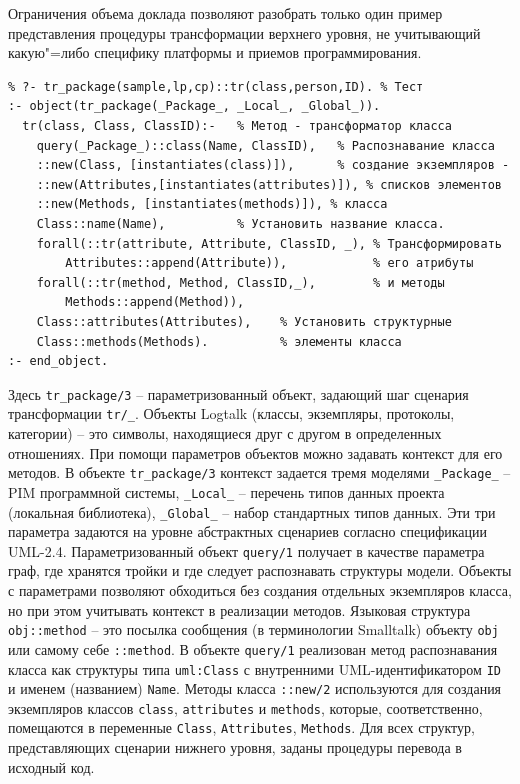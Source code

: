 \documentclass[12pt]{article}
\begin{document}
Ограничения объема доклада позволяют разобрать только один пример представления процедуры трансформации верхнего уровня, не учитывающий какую"=либо специфику платформы и приемов программирования.
\begin{verbatim}
% ?- tr_package(sample,lp,cp)::tr(class,person,ID). % Тест
:- object(tr_package(_Package_, _Local_, _Global_)).
  tr(class, Class, ClassID):-   % Метод - трансформатор класса
    query(_Package_)::class(Name, ClassID),   % Распознавание класса
    ::new(Class, [instantiates(class)]),      % создание экземпляров -
    ::new(Attributes,[instantiates(attributes)]), % списков элементов
    ::new(Methods, [instantiates(methods)]), % класса
    Class::name(Name),          % Установить название класса.
    forall(::tr(attribute, Attribute, ClassID, _), % Трансформировать
        Attributes::append(Attribute)),            % его атрибуты
    forall(::tr(method, Method, ClassID,_),        % и методы
        Methods::append(Method)),
    Class::attributes(Attributes),    % Установить структурные
    Class::methods(Methods).          % элементы класса
:- end_object.
\end{verbatim}

Здесь \texttt{tr\_package/3} -- параметризованный объект, задающий шаг сценария трансформации \texttt{tr/\_}.  Объекты Logtalk (классы, экземпляры, протоколы, категории) -- это символы, находящиеся друг с другом в определенных отношениях.  При помощи параметров объектов можно задавать контекст для его методов.  В объекте \texttt{tr\_package/3} контекст задается тремя моделями \texttt{\_Package\_} -- PIM программной системы, \texttt{\_Local\_} -- перечень типов данных проекта (локальная библиотека), \texttt{\_Global\_} -- набор стандартных типов данных.  Эти три параметра задаются на уровне абстрактных сценариев согласно спецификации UML-2.4.  Параметризованный объект \texttt{query/1} получает в качестве параметра граф, где хранятся тройки и где следует распознавать структуры модели.  Объекты с параметрами позволяют обходиться без создания отдельных экземпляров класса, но при этом учитывать контекст в реализации методов.  Языковая структура \texttt{obj::method} -- это посылка сообщения (в терминологии Smalltalk) объекту \texttt{obj} или самому себе \texttt{::method}.  В объекте \texttt{query/1} реализован метод распознавания класса как структуры типа \texttt{uml:Class} с внутренними UML-идентификатором \texttt{ID} и именем (названием) \texttt{Name}.  Методы класса \texttt{::new/2} используются для создания экземпляров классов \texttt{class}, \texttt{attributes} и \texttt{methods}, которые, соответственно, помещаются в переменные \texttt{Class}, \texttt{Attributes}, \texttt{Methods}.  Для всех структур, представляющих сценарии нижнего уровня, заданы процедуры перевода в исходный код.
\end{document}
